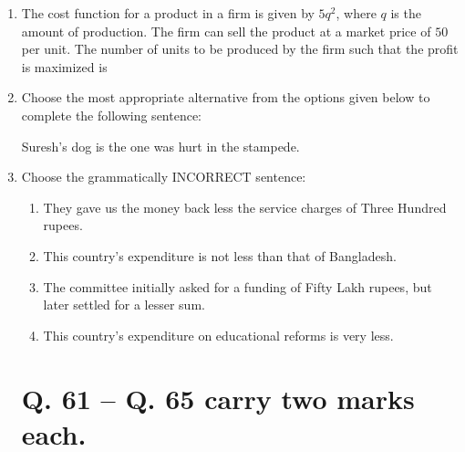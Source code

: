 \documentclass[journal,12pt,onecolumn]{IEEEtran}
\theoremstyle{remark}
\begin{document}
\begin{enumerate}
\item The cost function for a product in a firm is given by $5q^2$, where $q$ is the amount of production. The firm can sell the product at a market price of $50$ per unit. The number of units to be produced by the firm such that the profit is maximized is
\hfill{}
    \begin{enumerate}
    \end{enumerate}

\item Choose the most appropriate alternative from the options given below to complete the following sentence:
    
    Suresh's dog is the one \underline{\hspace{1cm}} was hurt in the stampede.
    \hfill{}
    \begin{enumerate}
    \end{enumerate}

\item Choose the grammatically INCORRECT sentence:
\hfill{}
    \begin{enumerate}[label=(\Alph*)]
        \item They gave us the money back less the service charges of Three Hundred rupees.
        \item This country's expenditure is not less than that of Bangladesh.
        \item The committee initially asked for a funding of Fifty Lakh rupees, but later settled for a lesser sum.
        \item This country's expenditure on educational reforms is very less.
    \end{enumerate}

\section*{Q. 61 -- Q. 65 carry two marks each.}


\end{enumerate}
\end{document}
